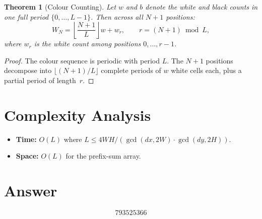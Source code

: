 \documentclass[11pt]{article}
\newtheorem{theorem}{Theorem}
\theoremstyle{definition}
\begin{document}
\begin{theorem}[Colour Counting]
Let $w$ and $b$ denote the white and black counts in one full period $\{0,\ldots,L-1\}$. Then across all $N+1$ positions:
\[
W_N = \left\lfloor\frac{N+1}{L}\right\rfloor w + w_r, \qquad r = (N+1)\bmod L,
\]
where $w_r$ is the white count among positions $0,\ldots,r-1$.
\end{theorem}

\begin{proof}
The colour sequence is periodic with period $L$. The $N+1$ positions decompose into $\lfloor(N+1)/L\rfloor$ complete periods of $w$ white cells each, plus a partial period of length~$r$.
\end{proof}

\section{Complexity Analysis}

\begin{itemize}
\item \textbf{Time:} $O(L)$ where $L\le 4WH/(\gcd(dx,2W)\cdot\gcd(dy,2H))$.
\item \textbf{Space:} $O(L)$ for the prefix-sum array.
\end{itemize}

\section{Answer}

\[
\boxed{793525366}
\]
\end{document}

